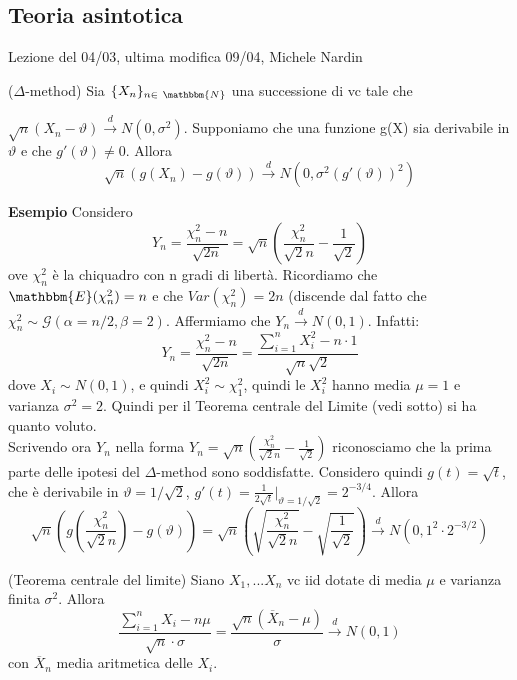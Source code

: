 \subsection{Teoria asintotica}
Lezione del 04/03, ultima modifica 09/04, Michele Nardin

\begin{teo}
\noindent
($\Delta$-method) Sia $\{X_n\}_{n \in\ \mathbbm{N}}$ una successione di vc
tale che 

\noindent $\sqrt{n}(X_n-\vartheta)\stackrel{d}{\rightarrow}N(0,\sigma^2)$. 
Supponiamo che una funzione g(X) sia derivabile in $\vartheta$ e che $g'(\vartheta)\neq0$. Allora $$\sqrt{n}(g(X_n)-g(\vartheta))\stackrel{d}{\rightarrow}N(0,\sigma^2(g'(\vartheta))^2)$$
\end{teo}

\noindent\textbf{Esempio}
Considero $$Y_n=\frac{\chi^2_n-n}{\sqrt{2n}}=\sqrt{n}\left(\frac{\chi^2_n}{\sqrt{2}n}-\frac{1}{\sqrt{2}}\right)$$ ove $\chi^2_n$ è la chiquadro con n gradi di libertà. 
Ricordiamo che $\mathbbm{E}(\chi^2_n)=n$ e che $Var(\chi^2_n)=2n$ (discende dal fatto che $\chi^2_n \sim \mathcal{G}(\alpha=n/2,\beta=2)$. 
Affermiamo che $Y_n \stackrel{d}{\rightarrow} N(0,1)$. Infatti:
$$Y_n = \frac{\chi^2_n-n}{\sqrt{2n}} = \frac{\sum_{i=1}^n X_i^2 - n \cdot 1}{\sqrt{n} \sqrt{2}}$$
dove $X_i \sim N(0,1)$, e quindi $X_i^2 \sim \chi^2_1$, quindi le $X_i^2$ hanno media $\mu=1$ e varianza $\sigma^2=2$. Quindi per il Teorema centrale del Limite (vedi sotto) si ha quanto voluto.\\
Scrivendo ora $Y_n$ nella forma $Y_n=\sqrt{n}\left(\frac{\chi^2_n}{\sqrt{2}n}-\frac{1}{\sqrt{2}}\right)$ riconosciamo che la prima parte delle ipotesi del $\Delta$-method sono soddisfatte.
Considero quindi $g(t)=\sqrt{t}$, che è derivabile in $\vartheta=1/\sqrt{2}$, $g'(t)=\frac{1}{2\sqrt{t}}|_{\vartheta=1/\sqrt{2}}=2^{-3/4}$.
Allora $$\sqrt{n}(g\left(\frac{\chi^2_n}{\sqrt{2}n}\right)-g(\vartheta))=
\sqrt{n}\left(\sqrt{\frac{\chi^2_n}{\sqrt{2}n}}-\sqrt{\frac{1}{\sqrt{2}}}\right)
\stackrel{d}{\rightarrow}N(0,1^2\cdot 2^{-3/2})$$

\begin{teo}
(Teorema centrale del limite) Siano $X_1,...X_n$ vc iid dotate di media $\mu$ e varianza finita $\sigma^2$. Allora 
$$\frac{\sum_{i=1}^n X_i - n\mu}{\sqrt{n}\cdot \sigma} = \frac{\sqrt{n}(\overline{X}_n-\mu)}{\sigma}\stackrel{d}{\rightarrow}N(0,1)$$
con $\overline{X}_n$ media aritmetica delle $X_i$.
\end{teo}

